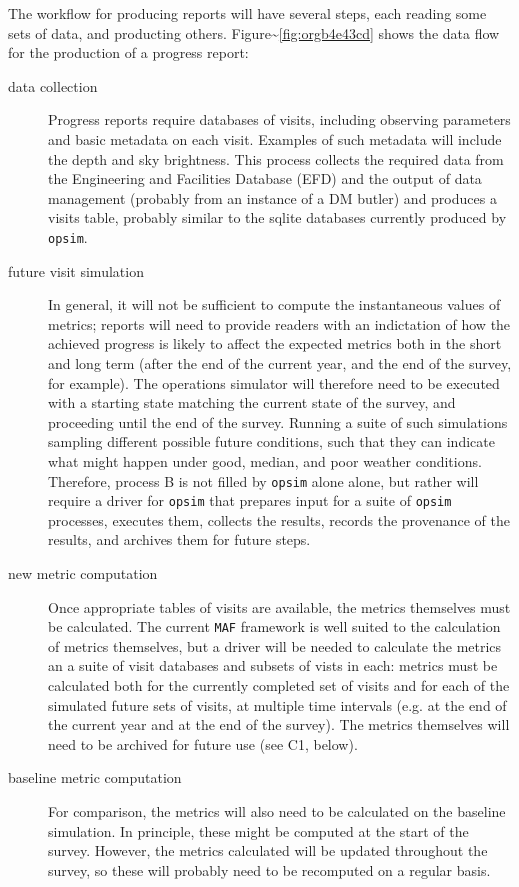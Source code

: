The workflow for producing reports will have several steps, each reading some sets of data, and producting others. Figure\textasciitilde{}\ref{fig:orgb4e43cd} shows the data flow for the production of a progress report:

\begin{description}
\item[{data collection}] Progress reports require databases of visits, including observing parameters and basic metadata on each visit. Examples of such metadata will include the depth and sky brightness. This process collects the required data from the Engineering and Facilities Database (EFD) and the output of data management (probably from an instance of a DM butler) and produces a visits table, probably similar to the sqlite databases currently produced by \texttt{opsim}.
\item[{future visit simulation}] In general, it will not be sufficient to compute the instantaneous values of metrics; reports will need to provide readers with an indictation of how the achieved progress is likely to affect the expected metrics both in the short and long term (after the end of the current year, and the end of the survey, for example). The operations simulator will therefore need to be executed with a starting state matching the current state of the survey, and proceeding until the end of the survey. Running a suite of such simulations sampling different possible future conditions, such that they can indicate what might happen under good, median, and poor weather conditions. Therefore, process B is not filled by \texttt{opsim} alone alone, but rather will require a driver for \texttt{opsim} that prepares input for a suite of \texttt{opsim} processes, executes them, collects the results, records the provenance of the results, and archives them for future steps.
\item[{new metric computation}] Once appropriate tables of visits are available, the metrics themselves must be calculated. The current \texttt{MAF} framework is well suited to the calculation of metrics themselves, but a driver will be needed to calculate the metrics an a suite of visit databases and subsets of vists in each: metrics must be calculated both for the currently completed set of visits and for each of the simulated future sets of visits, at multiple time intervals (e.g. at the end of the current year and at the end of the survey). The metrics themselves will need to be archived for future use (see C1, below).
\item[{baseline metric computation}] For comparison, the metrics will also need to be calculated on the baseline simulation. In principle, these might be computed at the start of the survey. However, the metrics calculated will be updated throughout the survey, so these will probably need to be recomputed on a regular basis.

\end{description}
